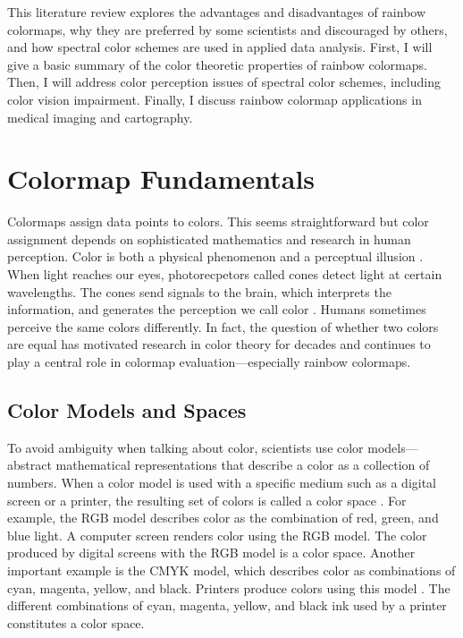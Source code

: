 \documentclass[journal,12pt]{IEEEtran}
\begin{document}
This literature review explores the advantages and disadvantages
of rainbow colormaps, why they are preferred by some
scientists and discouraged by others, and how spectral color schemes are used
in applied data analysis. First, I will give a basic summary 
of the color theoretic properties of rainbow colormaps. Then, I will
address color perception issues of spectral color schemes, including
color vision impairment. Finally, I discuss rainbow colormap applications
in medical imaging and cartography.

\section{Colormap Fundamentals}

Colormaps assign data points to colors. This seems straightforward but color assignment
depends on sophisticated mathematics and research in human perception. 
Color is both a physical phenomenon and a perceptual illusion \cite{endofrainbow}.
When light reaches our eyes, photorecpetors called cones detect light at certain wavelengths.
The cones send signals to the brain, which interprets the information,
and generates the perception we call color \cite{viridis}. Humans sometimes perceive the same
colors differently. In fact, the question of whether two colors are equal has motivated
research in color theory for decades and continues to play a central role in colormap 
evaluation---especially rainbow colormaps.

\subsection{Color Models and Spaces}

To avoid ambiguity when talking about color, scientists use
color models---abstract mathematical representations that
describe a color as a collection of numbers.
When a color model is used with a specific medium such as a digital screen or a printer, the resulting set
of colors is called a color space \cite{colorimetry}. For example, the RGB model
describes color as the combination of red, green, and
blue light. A computer screen renders color using the
RGB model. The color produced by digital screens
with the RGB model is a color space. Another important example is the
CMYK model, which describes color as combinations of
cyan, magenta, yellow, and black. Printers produce colors using this model
\cite{colormapping}. The different combinations of cyan, magenta, yellow, and black
ink used by a printer constitutes a color space.
\end{document}
